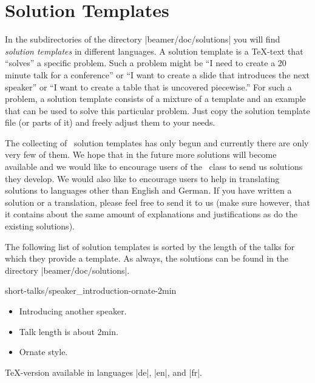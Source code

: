 %
%
%

\section{Solution Templates}
\label{section-solutions}

In the subdirectories of the directory |beamer/doc/solutions| you will find \emph{solution templates} in different languages. A solution template is a \TeX-text that ``solves'' a specific problem. Such a problem might be ``I need to create a 20 minute talk for a conference'' or ``I want to create a slide that introduces the next speaker'' or ``I want to create a table that is uncovered piecewise.'' For such a problem, a solution template consists of a mixture of a template and an example that can be used to solve this particular problem. Just copy the solution template file (or parts of it) and freely adjust them to your needs.

The collecting of \beamer\ solution templates has only begun and currently there are only very few of them. We hope that in the future more solutions will become available and we would like to encourage users of the \beamer\ class to send us solutions they develop. We would also like to encourage users to help in translating solutions to languages other than English and German. If you have written a solution or a translation, please feel free to send it to us (make sure however, that it contains about the same amount of explanations and justifications as do the existing solutions).

The following list of solution templates is sorted by the length of the talks for which they provide a template. As always, the solutions can be found in the directory |beamer/doc/solutions|.

\begin{solution}{short-talks/speaker\_introduction-ornate-2min}
  \begin{itemize}
  \item
    Introducing another speaker.
  \item
    Talk length is about 2min.
  \item
    Ornate style.
  \end{itemize}

  \beamernote
  \TeX-version available in languages |de|, |en|, and |fr|.

\end{solution}

